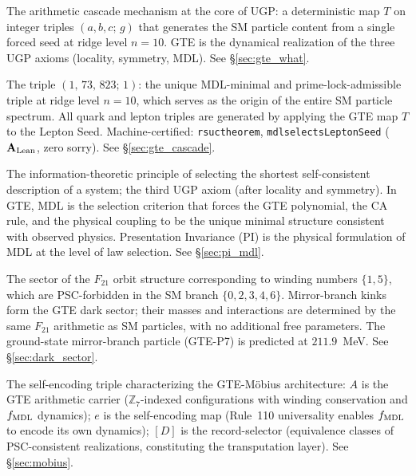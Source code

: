 \documentclass[11pt,openany]{book}
\theoremstyle{remark}
\newcommand{\lean}[1]{%
  \penalty-100
  \begingroup\def\_{\textunderscore\allowbreak}\texttt{#1}\endgroup}
\newcommand{\CatAL}{\ensuremath{\textbf{A}_{\rm Lean}}}
\begin{document}
\begin{appendices}
\begin{description}[leftmargin=*,font=\bfseries,itemsep=6pt]
\item[GTE --- Generative Triple Evolution]
The arithmetic cascade mechanism at the core of UGP: a deterministic map $T$ on
integer triples $(a,b,c;\,g)$ that generates the SM particle content from a single
forced seed at ridge level $n=10$.
GTE is the dynamical realization of the three UGP axioms (locality, symmetry, MDL).
See \S\ref{sec:gte_what}.

\item[Lepton Seed]
The triple $(1,\,73,\,823;\,1)$: the unique MDL-minimal and prime-lock-admissible
triple at ridge level $n=10$, which serves as the origin of the entire SM particle
spectrum.
All quark and lepton triples are generated by applying the GTE map $T$ to the
Lepton Seed.
Machine-certified: \lean{rsuc\_theorem}, \lean{mdl\_selects\_LeptonSeed} (\CatAL,
zero sorry).
See \S\ref{sec:gte_cascade}.

\item[MDL --- Minimum Description Length]
The information-theoretic principle of selecting the shortest self-consistent
description of a system; the third UGP axiom (after locality and symmetry).
In GTE, MDL is the selection criterion that forces the GTE polynomial, the CA rule,
and the physical coupling to be the unique minimal structure consistent with
observed physics.
Presentation Invariance (PI) is the physical formulation of MDL at the level of
law selection.
See \S\ref{sec:pi_mdl}.

\item[Mirror branch (dark sector)]
The sector of the $F_{21}$ orbit structure corresponding to winding numbers
$\{1,5\}$, which are PSC-forbidden in the SM branch $\{0,2,3,4,6\}$.
Mirror-branch kinks form the GTE dark sector; their masses and interactions are
determined by the same $F_{21}$ arithmetic as SM particles, with no additional
free parameters.
The ground-state mirror-branch particle (GTE-P7) is predicted at $211.9$~MeV.
See \S\ref{sec:dark_sector}.

\item[Möbius triple --- $(A,\,e,\,{[D]})$]
The self-encoding triple characterizing the GTE-Möbius architecture:
$A$ is the GTE arithmetic carrier ($\mathbb{Z}_7$-indexed configurations with
winding conservation and $f_{\rm MDL}$ dynamics);
$e$ is the self-encoding map (Rule~110 universality enables $f_{\rm MDL}$ to
encode its own dynamics);
$[D]$ is the record-selector (equivalence classes of PSC-consistent realizations,
constituting the transputation layer).
See \S\ref{sec:mobius}.


\end{description}
\end{appendices}
\end{document}

